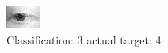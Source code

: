 \begin{figure}[h!]
\begin{center}
\includegraphics[width=0.60\columnwidth]{figures/ID2616_class_3_target_4.png}
\end{center}
\caption{ Classification: 3 actual target: 4}
\label{fig:ID2616_class_3_target_4}
\end{figure}
